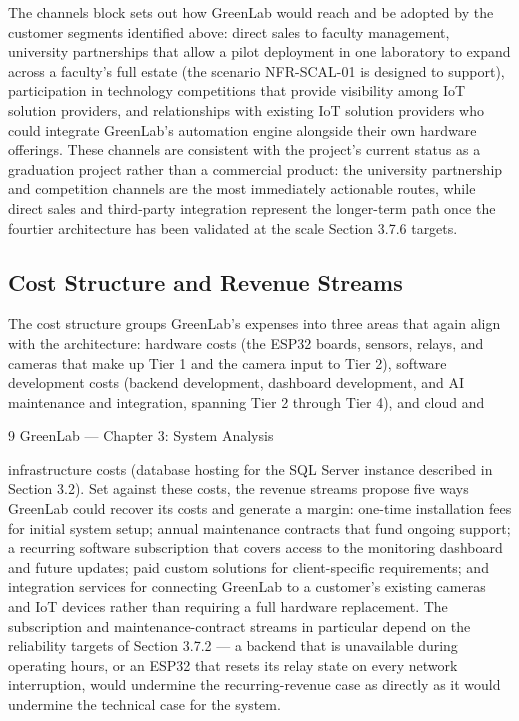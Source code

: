 The channels block sets out how GreenLab would reach and be adopted by the customer segments
identified above: direct sales to faculty management, university partnerships that allow a pilot
deployment in one laboratory to expand across a faculty's full estate (the scenario NFR-SCAL-01
is designed to support), participation in technology competitions that provide visibility among IoT
solution providers, and relationships with existing IoT solution providers who could integrate
GreenLab's automation engine alongside their own hardware offerings. These channels are
consistent with the project's current status as a graduation project rather than a commercial
product: the university partnership and competition channels are the most immediately actionable
routes, while direct sales and third-party integration represent the longer-term path once the fourtier architecture has been validated at the scale Section 3.7.6 targets.

\subsection{Cost Structure and Revenue Streams}

The cost structure groups GreenLab's expenses into three areas that again align with the
architecture: hardware costs (the ESP32 boards, sensors, relays, and cameras that make up Tier 1
and the camera input to Tier 2), software development costs (backend development, dashboard
development, and AI maintenance and integration, spanning Tier 2 through Tier 4), and cloud and

9
GreenLab --- Chapter 3: System Analysis


infrastructure costs (database hosting for the SQL Server instance described in Section 3.2). Set
against these costs, the revenue streams propose five ways GreenLab could recover its costs and
generate a margin: one-time installation fees for initial system setup; annual maintenance contracts
that fund ongoing support; a recurring software subscription that covers access to the monitoring
dashboard and future updates; paid custom solutions for client-specific requirements; and
integration services for connecting GreenLab to a customer's existing cameras and IoT devices
rather than requiring a full hardware replacement. The subscription and maintenance-contract
streams in particular depend on the reliability targets of Section 3.7.2 --- a backend that is
unavailable during operating hours, or an ESP32 that resets its relay state on every network
interruption, would undermine the recurring-revenue case as directly as it would undermine the
technical case for the system.

